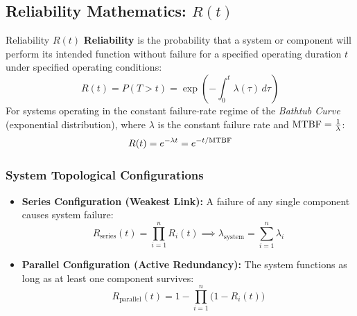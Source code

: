 \subsection{Reliability Mathematics: \texorpdfstring{$R(t)$}{R(t)}}
\begin{definitionbox}{Reliability $R(t)$}
\textbf{Reliability} is the probability that a system or component will perform its intended function without failure for a specified operating duration $t$ under specified operating conditions:
\begin{equation}
    R(t) = P(T > t) = \exp\left( - \int_0^t \lambda(\tau) \, d\tau \right)
\end{equation}
For systems operating in the constant failure-rate regime of the \textit{Bathtub Curve} (exponential distribution), where $\lambda$ is the constant failure rate and $\text{MTBF} = \frac{1}{\lambda}$:
\begin{equation}
    R(t) = e^{-\lambda t} = e^{-t / \text{MTBF}}
\end{equation}
\end{definitionbox}

\subsubsection{System Topological Configurations}
\begin{itemize}[leftmargin=1.5em]
    \item \textbf{Series Configuration (Weakest Link):} A failure of any single component causes system failure:
    \begin{equation}
        R_{\text{series}}(t) = \prod_{i=1}^n R_i(t) \implies \lambda_{\text{system}} = \sum_{i=1}^n \lambda_i
    \end{equation}
    \item \textbf{Parallel Configuration (Active Redundancy):} The system functions as long as at least one component survives:
    \begin{equation}
        R_{\text{parallel}}(t) = 1 - \prod_{i=1}^n \Big( 1 - R_i(t) \Big)
    \end{equation}
\end{itemize}

